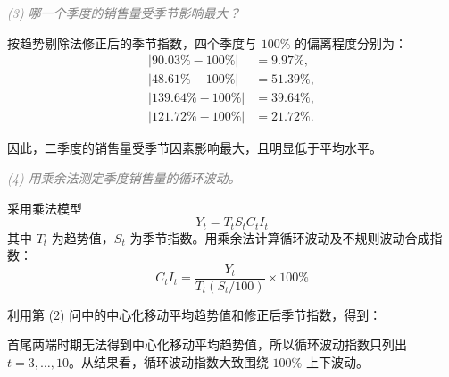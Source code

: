 \documentclass{article}
\begin{document}
\textit{\textcolor{gray}{(3) 哪一个季度的销售量受季节影响最大？}}

按趋势剔除法修正后的季节指数，四个季度与 $100\%$ 的偏离程度分别为：
\[
\begin{aligned}
    |90.03\%-100\%|&=9.97\%,\\
    |48.61\%-100\%|&=51.39\%,\\
    |139.64\%-100\%|&=39.64\%,\\
    |121.72\%-100\%|&=21.72\%.
\end{aligned}
\]

因此，二季度的销售量受季节因素影响最大，且明显低于平均水平。

\textit{\textcolor{gray}{(4) 用乘余法测定季度销售量的循环波动。}}

采用乘法模型
\[
    Y_t=T_tS_tC_tI_t
\]
其中 $T_t$ 为趋势值，$S_t$ 为季节指数。用乘余法计算循环波动及不规则波动合成指数：
\[
    C_tI_t=\dfrac{Y_t}{T_t(S_t/100)}\times100\%
\]

利用第 (2) 问中的中心化移动平均趋势值和修正后季节指数，得到：
\begin{table}[H]
    \centering
    \renewcommand{\arraystretch}{1.5}
\end{table}

首尾两端时期无法得到中心化移动平均趋势值，所以循环波动指数只列出 $t=3,\ldots,10$。从结果看，循环波动指数大致围绕 $100\%$ 上下波动。
\end{document}
